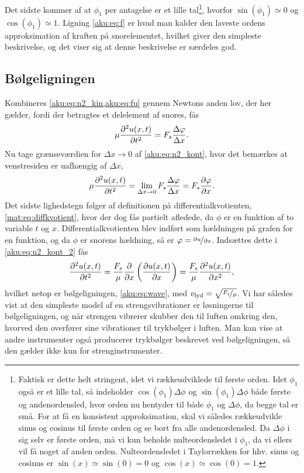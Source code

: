 %
Det sidste kommer af at $\phi_1$ per antagelse er et lille tal\footnote{Faktisk er dette helt stringent, idet vi rækkeudviklede til første orden. Idet $\phi_1$ også er et lille tal, så indeholder $\cos(\phi_1)\Delta\phi$ og $\sin(\phi_1)\Delta\phi$ både første og andenordensled, hvor orden nu hentyder til både $\phi_1$ og $\Delta\phi$, da begge tal er små. For at få en konsistent approksimation, skal vi således rækkeudvikle sinus og cosinus til første orden og se bort fra alle andenordensled. Da $\Delta\phi$ i sig selv er første orden, må vi kun beholde nulteordensledet i $\phi_1$, da vi ellers vil få noget af anden orden. Nulteordensledet i Taylorrækken for hhv. sinus og cosinus er $\sin(x)\simeq\sin(0)=0$ og $\cos(x)\simeq\cos(0)=1$.}, hvorfor $\sin(\phi_1) \simeq 0$ og $\cos(\phi_1)\simeq 1$. Ligning \eqref{aku:eq:f} er hvad man kalder den laveste ordens approksimation af kraften på snorelementet, hvilket giver den simpleste beskrivelse, og det viser sig at denne beskrivelse er særdeles god. \\

\subsection{Bølgeligningen}
Kombineres \cref{aku:eq:n2_kin,aku:eq:fu} gennem Newtons anden lov, der her gælder, fordi der betragtes et delelement af snores, fås
%
\begin{align} \label{aku:eq:n2_kont}
    \mu \pdv[2]{u(x,t)}{t} = F_s\frac{\Delta\phi}{\Delta x}.
\end{align}
%
Nu tage grænseværdien for $\Delta x \rightarrow 0$ af \cref{aku:eq:n2_kont}, hvor det bemærkes at venstresiden er uafhængig af $\Delta x$,
%
\begin{align} \label{aku:eq:n2_kont_2}
    \mu \pdv[2]{u(x,t)}{t} = \lim_{\Delta x\rightarrow0}F_s\frac{\Delta\phi}{\Delta x} = F_s\pdv{\phi}{x}.
\end{align}
%
Det sidste lighedstegn følger af definitionen på differentialkvotienten, \cref{mat:eq:diffkvotient}, hvor der dog fås partielt afledede, da $\phi$ er en funktion af to variable $t$ og $x$. Differentialkvotienten blev indført som hældningen på grafen for en funktion, og da $\phi$ er snorens hældning, så er $\phi = \nicefrac{\partial{u}}{\partial{x}}$. Indsættes dette i \cref{aku:eq:n2_kont_2} fås
%
\begin{align} \label{aku:eq:wave_eq}
    \pdv[2]{u(x,t)}{t} = \frac{F_s}{\mu} \pdv{}{x}\left(\pdv{u(x,t)}{x}\right) = \frac{F_s}{\mu} \pdv[2]{u(x,t)}{x},
\end{align}
%
hvilket netop er bølgeligningen, \cref{aku:eq:wave}, med $v_\mathrm{lyd}=\sqrt{\nicefrac{F_s}{\mu}}$. Vi har således vist at den simpleste model af en strengsvibrationer er løsningerne til bølgeligningen, og når strengen vibrerer skubber den til luften omkring den, hvorved den overfører sine vibrationer til trykbølger i luften. Man kan vise at andre instrumenter også producerer trykbølger beskrevet ved bølgeligningen, så den gælder ikke kun for strenginstrumenter.